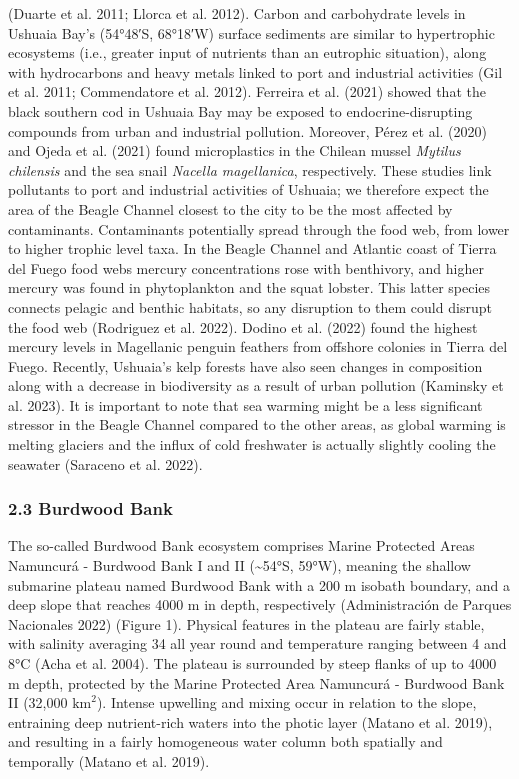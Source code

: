 \documentclass[
]{article}
\begin{document}
(Duarte et al. 2011; Llorca et al. 2012). Carbon and carbohydrate levels
in Ushuaia Bay's (54°48′S, 68°18′W) surface sediments are similar to
hypertrophic ecosystems (i.e., greater input of nutrients than an
eutrophic situation), along with hydrocarbons and heavy metals linked to
port and industrial activities (Gil et al. 2011; Commendatore et al.
2012). Ferreira et al. (2021) showed that the black southern cod in
Ushuaia Bay may be exposed to endocrine-disrupting compounds from urban
and industrial pollution. Moreover, Pérez et al. (2020) and Ojeda et al.
(2021) found microplastics in the Chilean mussel \emph{Mytilus
chilensis} and the sea snail \emph{Nacella magellanica}, respectively.
These studies link pollutants to port and industrial activities of
Ushuaia; we therefore expect the area of the Beagle Channel closest to
the city to be the most affected by contaminants. Contaminants
potentially spread through the food web, from lower to higher trophic
level taxa. In the Beagle Channel and Atlantic coast of Tierra del Fuego
food webs mercury concentrations rose with benthivory, and higher
mercury was found in phytoplankton and the squat lobster. This latter
species connects pelagic and benthic habitats, so any disruption to them
could disrupt the food web (Rodriguez et al. 2022). Dodino et al. (2022)
found the highest mercury levels in Magellanic penguin feathers from
offshore colonies in Tierra del Fuego. Recently, Ushuaia's kelp forests
have also seen changes in composition along with a decrease in
biodiversity as a result of urban pollution (Kaminsky et al. 2023). It
is important to note that sea warming might be a less significant
stressor in the Beagle Channel compared to the other areas, as global
warming is melting glaciers and the influx of cold freshwater is
actually slightly cooling the seawater (Saraceno et al. 2022).

\subsubsection{2.3 Burdwood Bank}\label{burdwood-bank}

The so-called Burdwood Bank ecosystem comprises Marine Protected Areas
Namuncurá - Burdwood Bank I and II (\textasciitilde54°S, 59°W), meaning
the shallow submarine plateau named Burdwood Bank with a 200 m isobath
boundary, and a deep slope that reaches 4000 m in depth, respectively
(Administración de Parques Nacionales 2022) (Figure 1). Physical
features in the plateau are fairly stable, with salinity averaging 34
all year round and temperature ranging between 4 and 8°C (Acha et al.
2004). The plateau is surrounded by steep flanks of up to 4000 m depth,
protected by the Marine Protected Area Namuncurá - Burdwood Bank II
(32,000 \(\text{km}^2\)). Intense upwelling and mixing occur in relation
to the slope, entraining deep nutrient-rich waters into the photic layer
(Matano et al. 2019), and resulting in a fairly homogeneous water column
both spatially and temporally (Matano et al. 2019).
\end{document}
